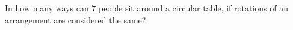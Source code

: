 In how many ways can $7$ people sit around a circular table, if rotations of an arrangement are considered the same?
